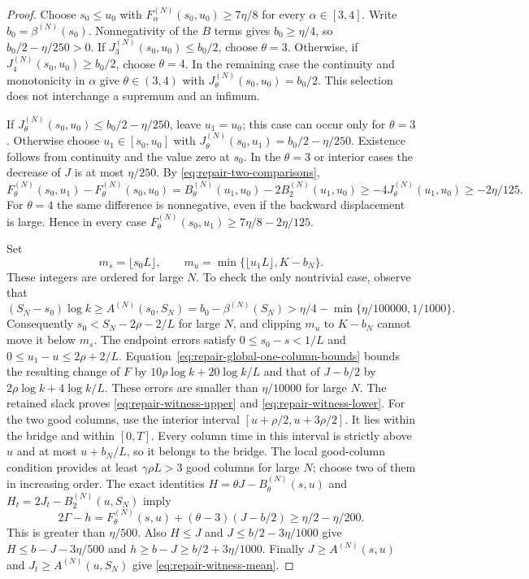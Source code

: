 \begin{proof}
Choose $s_0\le u_0$ with
$F_\alpha^{(N)}(s_0,u_0)\ge7\eta/8$ for every $\alpha\in[3,4]$.
Write $b_0=\beta^{(N)}(s_0)$.  Nonnegativity of the $B$ terms gives
$b_0\ge\eta/4$, so $b_0/2-\eta/250>0$.
If $J_3^{(N)}(s_0,u_0)\le b_0/2$, choose $\theta=3$.
Otherwise, if $J_4^{(N)}(s_0,u_0)\ge b_0/2$, choose $\theta=4$.
In the remaining case the continuity and monotonicity in $\alpha$ give
$\theta\in(3,4)$ with $J_\theta^{(N)}(s_0,u_0)=b_0/2$.
This selection does not interchange a supremum and an infimum.

If $J_\theta^{(N)}(s_0,u_0)\le b_0/2-\eta/250$, leave $u_1=u_0$;
this case can occur only for $\theta=3$.  Otherwise choose
$u_1\in[s_0,u_0]$ with
$J_\theta^{(N)}(s_0,u_1)=b_0/2-\eta/250$.
Existence follows from continuity and the value zero at $s_0$.
In the $\theta=3$ or interior cases the decrease of $J$ is at most
$\eta/250$.  By \eqref{eq:repair-two-comparisons},
\[
 F_\theta^{(N)}(s_0,u_1)-F_\theta^{(N)}(s_0,u_0)
 =B_\theta^{(N)}(u_1,u_0)-2B_2^{(N)}(u_1,u_0)
 \ge-4J_\theta^{(N)}(u_1,u_0)\ge-2\eta/125.
\]
For $\theta=4$ the same difference is nonnegative, even if the
backward displacement is large.  Hence in every case
$F_\theta^{(N)}(s_0,u_1)\ge7\eta/8-2\eta/125$.

Set
\[
 m_s=\lfloor s_0L\rfloor,\qquad
 m_u=\min\{\lfloor u_1L\rfloor,K-b_N\}.
\]
These integers are ordered for large $N$.  To check the only nontrivial
case, observe that
\[
 (S_N-s_0)\log k\ge A^{(N)}(s_0,S_N)
 =b_0-\beta^{(N)}(S_N)>\eta/4-\min\{\eta/100000,1/1000\}.
\]
Consequently $s_0<S_N-2\rho-2/L$ for large $N$, and clipping $m_u$ to
$K-b_N$ cannot move it below $m_s$.
The endpoint errors satisfy $0\le s_0-s<1/L$ and
$0\le u_1-u\le 2\rho+2/L$.
Equation~\eqref{eq:repair-global-one-column-bounds} bounds the resulting
change of $F$ by $10\rho\log k+20\log k/L$ and that of
$J-b/2$ by $2\rho\log k+4\log k/L$.
These errors are smaller than $\eta/10000$ for large $N$.
The retained slack proves \eqref{eq:repair-witness-upper} and
\eqref{eq:repair-witness-lower}.
For the two good columns, use the interior interval
$[u+\rho/2,u+3\rho/2]$. It lies within the bridge and within $[0,T]$.
Every column time in this interval is strictly above $u$ and at most
$u+b_N/L$, so it belongs to the bridge. The local good-column condition
provides at least $\gamma\rho L>3$ good columns for large $N$; choose two
of them in increasing order.
The exact identities $H=\theta J-B_\theta^{(N)}(s,u)$ and
$H_t=2J_t-B_2^{(N)}(u,S_N)$ imply
\[
 2\Gamma-h=F_\theta^{(N)}(s,u)+(\theta-3)(J-b/2)
 \ge\eta/2-\eta/200.
\]
This is greater than $\eta/500$.
Also $H\le J$ and $J\le b/2-3\eta/1000$ give
$H\le b-J-3\eta/500$ and $h\ge b-J\ge b/2+3\eta/1000$.
Finally $J\ge A^{(N)}(s,u)$ and $J_t\ge A^{(N)}(u,S_N)$ give
\eqref{eq:repair-witness-mean}.
\end{proof}

